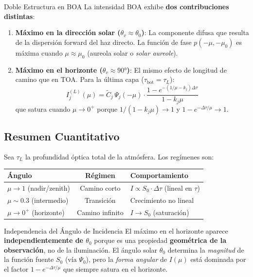 \documentclass[a4paper,11pt]{article}
\begin{document}
\begin{physics}{Doble Estructura en BOA}
La intensidad BOA exhibe \textbf{dos contribuciones distintas}:
\begin{enumerate}
\item \textbf{M\'aximo en la direcci\'on solar ($\theta_v \approx \theta_0$)}: La componente difusa que resulta de la dispersi\'on forward del haz directo.  La funci\'on de fase $p(-\mu, -\mu_0)$ es m\'axima cuando $\mu \approx \mu_0$ (aureola solar o \textit{solar aureole}).
\item \textbf{M\'aximo en el horizonte ($\theta_v \approx 90°$)}: El mismo efecto de longitud de camino que en TOA.  Para la \'ultima capa ($\tau_{\text{bot}} = \tau_L$):
\begin{equation}
I^{(L)}_j(\mu) = \widetilde{C}_j \, \Psi_j(-\mu) \cdot \frac{1 - e^{-(1/\mu - k_j)\Delta\tau}}{1 - k_j \mu}
\end{equation}
que satura cuando $\mu \to 0^+$ porque $1/(1-k_j\mu) \to 1$ y $1 - e^{-\Delta\tau/\mu} \to 1$.
\end{enumerate}
\end{physics}

\subsection{Resumen Cuantitativo}

Sea $\tau_L$ la profundidad \'optica total de la atm\'osfera.  Los reg\'imenes son:
\begin{center}
\begin{tabular}{lcl}
\toprule
\textbf{\'Angulo} & \textbf{R\'egimen} & \textbf{Comportamiento} \\
\midrule
$\mu \to 1$ (nadir/zenith) & Camino corto & $I \propto S_0 \cdot \Delta\tau$ (lineal en $\tau$) \\
$\mu \sim 0.3$ (intermedio) & Transici\'on & Crecimiento no lineal \\
$\mu \to 0^+$ (horizonte) & Camino infinito & $I \to S_0$ (saturaci\'on) \\
\bottomrule
\end{tabular}
\end{center}

\begin{keyresult}{Independencia del \'Angulo de Incidencia}
El m\'aximo en el horizonte aparece \textbf{independientemente de $\theta_0$} porque es una propiedad \textbf{geom\'etrica de la observaci\'on}, no de la iluminaci\'on.  El \'angulo solar $\theta_0$ determina la \textit{magnitud} de la funci\'on fuente $S_0$ (v\'ia $\Psi_0$), pero la \textit{forma angular} de $I(\mu)$ est\'a dominada por el factor $1 - e^{-\Delta\tau/\mu}$ que siempre satura en el horizonte.
\end{keyresult}
\end{document}
